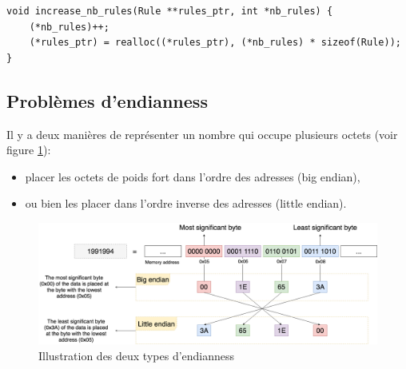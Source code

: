 \documentclass[a4paper]{article}
\begin{document}
\begin{lstlisting}[style=CStyle]
void increase_nb_rules(Rule **rules_ptr, int *nb_rules) {
    (*nb_rules)++;
    (*rules_ptr) = realloc((*rules_ptr), (*nb_rules) * sizeof(Rule));
}
\end{lstlisting}





\subsection{Problèmes d'endianness} \label{subsec:probendianness}



Il y a deux manières de représenter un nombre qui occupe plusieurs octets (voir figure \ref{fig:endianness}):
\begin{itemize}
    \item placer les octets de poids fort dans l'ordre des adresses (big endian),
    \item ou bien les placer dans l'ordre inverse des adresses (little endian).
\end{itemize}
\begin{figure}[H]
    \centering
    \includegraphics[width=0.90\linewidth]{images/Endian-Overview.png}
    \caption{Illustration des deux types d'endianness \cite{7}}
    \label{fig:endianness}
\end{figure}
\end{document}
